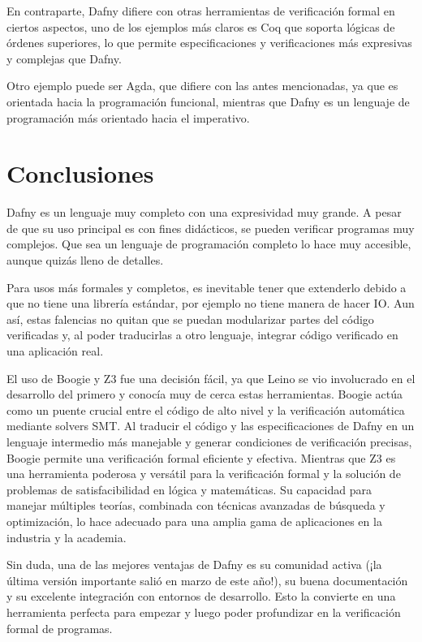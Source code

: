 \documentclass[runningheads]{llncs}
\begin{document}
En contraparte, Dafny difiere con otras herramientas de verificación formal en ciertos aspectos, uno de los ejemplos más claros es Coq 
que soporta lógicas de órdenes superiores, lo que permite especificaciones y verificaciones más expresivas y complejas que Dafny.

Otro ejemplo puede ser Agda, que difiere con las antes mencionadas, ya que 
es orientada hacia la programación funcional, mientras que Dafny es un lenguaje de programación más orientado hacia el imperativo. 
 
\section{Conclusiones}

Dafny es un lenguaje muy completo con una expresividad muy grande. A pesar de que su uso principal es con fines didácticos, se pueden verificar programas muy complejos. 
Que sea un lenguaje de programación completo lo hace muy accesible, aunque quizás lleno de detalles.

Para usos más formales y completos, es inevitable tener que extenderlo debido a que no tiene una librería estándar, por ejemplo no tiene manera de hacer IO.
Aun así, estas falencias no quitan que se puedan modularizar partes del código verificadas y, al poder traducirlas a otro lenguaje, integrar código verificado en una aplicación real.

El uso de Boogie y Z3 fue una decisión fácil, ya que Leino se vio involucrado en el desarrollo del primero y conocía muy de cerca estas herramientas.
Boogie actúa como un puente crucial entre el código de alto nivel y la verificación automática mediante solvers SMT. 
Al traducir el código y las especificaciones de Dafny en un lenguaje intermedio más manejable y generar condiciones de verificación precisas, 
Boogie permite una verificación formal eficiente y efectiva.
Mientras que Z3 es una herramienta poderosa y versátil para la verificación formal y la solución de problemas de satisfacibilidad en lógica y matemáticas. 
Su capacidad para manejar múltiples teorías, combinada con técnicas avanzadas de búsqueda y optimización, 
lo hace adecuado para una amplia gama de aplicaciones en la industria y la academia.

Sin duda, una de las mejores ventajas de Dafny es su comunidad activa (¡la última versión importante salió en marzo de este año!), 
su buena documentación y su excelente integración con entornos de desarrollo. Esto la convierte en una herramienta perfecta para empezar 
y luego poder profundizar en la verificación formal de programas.



\end{document}
